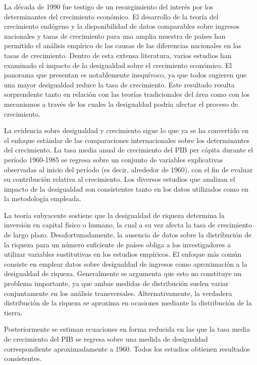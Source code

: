 \documentclass[10pt,a4paper]{article}
\begin{document}
La década de 1990 fue testigo de un resurgimiento del interés por los determinantes del crecimiento económico. El desarrollo de la teoría del crecimiento endógeno y la disponibilidad de datos comparables sobre ingresos nacionales y tasas de crecimiento para una amplia muestra de países han permitido el análisis empírico de las causas de las diferencias nacionales en las tasas de crecimiento. Dentro de esta extensa literatura, varios estudios han examinado el impacto de la desigualdad sobre el crecimiento económico. El panorama que presentan es notablemente inequívoco, ya que todos sugieren que una mayor desigualdad reduce la tasa de crecimiento. Este resultado resulta sorprendente tanto en relación con las teorías tradicionales del área como con los mecanismos a través de los cuales la desigualdad podría afectar el proceso de crecimiento.

La evidencia sobre desigualdad y crecimiento sigue lo que ya se ha convertido en el enfoque estándar de las comparaciones internacionales sobre los determinantes del crecimiento. La tasa media anual de crecimiento del PIB per cápita durante el período 1960-1985 se regresa sobre un conjunto de variables explicativas observadas al inicio del período (es decir, alrededor de 1960), con el fin de evaluar su contribución relativa al crecimiento. Los diversos estudios que analizan el impacto de la desigualdad son consistentes tanto en los datos utilizados como en la metodología empleada.

La teoría subyacente sostiene que la desigualdad de riqueza determina la inversión en capital físico o humano, la cual a su vez afecta la tasa de crecimiento de largo plazo. Desafortunadamente, la ausencia de datos sobre la distribución de la riqueza para un número suficiente de países obliga a los investigadores a utilizar variables sustitutivas en los estudios empíricos. El enfoque más común consiste en emplear datos sobre desigualdad de ingresos como aproximación a la desigualdad de riqueza. Generalmente se argumenta que esto no constituye un problema importante, ya que ambas medidas de distribución suelen variar conjuntamente en los análisis transversales. Alternativamente, la verdadera distribución de la riqueza se aproxima en ocasiones mediante la distribución de la tierra.

Posteriormente se estiman ecuaciones en forma reducida en las que la tasa media de crecimiento del PIB se regresa sobre una medida de desigualdad correspondiente aproximadamente a 1960. Todos los estudios obtienen resultados consistentes.
\end{document}
